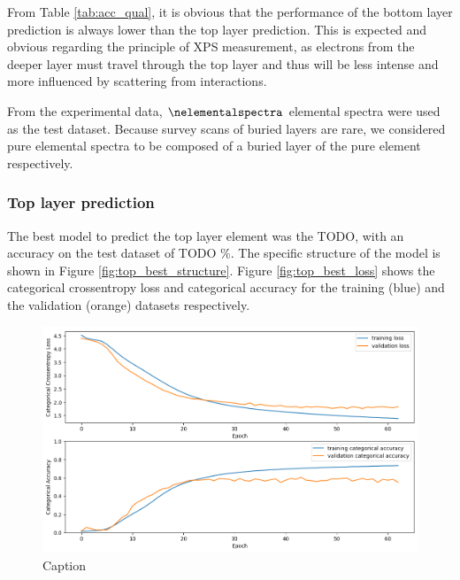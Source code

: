From Table \ref{tab:acc_qual}, it is obvious that the performance of the bottom layer prediction is always lower than the top layer prediction. This is expected and obvious regarding the principle of XPS measurement, as electrons from the deeper layer must travel through the top layer and thus will be less intense and more influenced by scattering from interactions.

From the experimental data, $\nelementalspectra$ elemental spectra were used as the test dataset. Because survey scans of buried layers are rare, we considered pure elemental spectra to be composed of a buried layer of the pure element respectively.

\subsubsection{Top layer prediction}
The best model to predict the top layer element was the TODO, with an accuracy on the test dataset of TODO \%. The specific structure of the model is shown in Figure \ref{fig:top_best_structure}. Figure \ref{fig:top_best_loss} shows the categorical crossentropy loss and categorical accuracy for the training (blue) and the validation (orange) datasets respectively. 

\begin{figure}
    \centering
    \includegraphics{Figures/top_best_loss_acc_vit_4_32_3_4_64.png}
    \caption{Caption}
    \label{fig:enter-label}
\end{figure}

